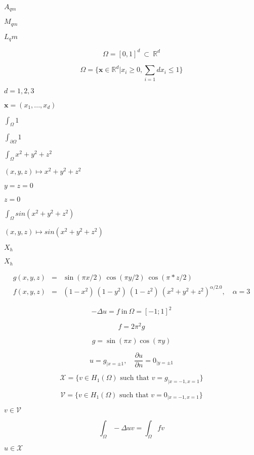 \documentclass{article}
\begin{document}
$A_{qm}$
\pagebreak

$M_{qm}$
\pagebreak

$L_qm$
\pagebreak

\[ \Omega=[0,1]^d\ \subset\ \mathbb{R}^d \]
\pagebreak

\[ \Omega=\{ \mathbf{x} \in \mathbb{R}^d | x_i \geq 0, \sum_{i=1}{d} x_i \leq 1 \} \]
\pagebreak

$ d=1,2,3 $
\pagebreak

$ \mathbf{x}=(x_1,...,x_d) $
\pagebreak

$ \int_\Omega 1 $
\pagebreak

$ \int_{\partial\Omega} 1 $
\pagebreak

$ \int_{\Omega} x^2+y^2+z^2 $
\pagebreak

$ (x,y,z) \mapsto x^2+y^2+z^2$
\pagebreak

$y=z=0$
\pagebreak

$ z=0 $
\pagebreak

$ \int_{\Omega} sin(x^2+y^2+z^2) $
\pagebreak

$ (x,y,z) \mapsto sin(x^2+y^2+z^2)$
\pagebreak

$ X_h $
\pagebreak

$ X_h$
\pagebreak

\begin{eqnarray} g(x,y,z) &=& \sin(\pi x/2)\ \cos(\pi y/2)\ \cos(\pi*z/2) \\ f(x,y,z) &=& (1-x^2)\ (1-y^2)\ (1-z^2)\ (x^2+y^2+z^2)^{\alpha/2.0},\quad \alpha=3 \end{eqnarray}
\pagebreak

\[ -\Delta u = f\ \text{in}\ \Omega = [-1;1]^2 \]
\pagebreak

\[ f= 2 \pi^2 g \]
\pagebreak

\[ g=\sin(\pi x) \cos(\pi y) \]
\pagebreak

\[ u=g_{|x=\pm 1}, \quad \frac{\partial u}{\partial n} = 0_{|y=\pm 1} \]
\pagebreak

\[ \mathcal{X} = \Big\{ v \in H_1(\Omega) \text{ such that } v=g_{|x=-1,x=1} \Big\} \]
\pagebreak

\[ \mathcal{V} = \Big\{ v \in H_1(\Omega) \text{ such that } v=0_{|x=-1,x=1} \Big\} \]
\pagebreak

$v \in \mathcal{V}$
\pagebreak

\begin{equation} \label{eq:13} \int_\Omega -\Delta u v = \int_\Omega f v \end{equation}
\pagebreak

$u \in \mathcal{X}$
\pagebreak
\end{document}
